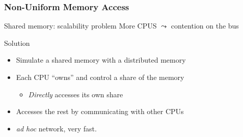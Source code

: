 \documentclass[xcolor={x11names,svgnames,psnames}]{beamer}
\begin{document}
  
  
  
  



\begin{frame}
  \frametitle{Non-Uniform Memory Access}

  \begin{alertblock}{Shared memory: scalability problem}
    More CPUS $\leadsto$ contention on the bus
  \end{alertblock}

  \begin{exampleblock}{Solution}
    \begin{itemize}
    \item Simulate a shared memory with a distributed memory
    \item Each CPU ``owns'' and control a share of the memory
      \begin{itemize}
      \item \emph{Directly} accesses its own share 
      \end{itemize}
    \item Accesses the rest by communicating with other CPUs
    \item[$\Rightarrow$] \textit{ad hoc} network, very fast.
    \end{itemize}
  \end{exampleblock}
\end{frame}
\end{document}
